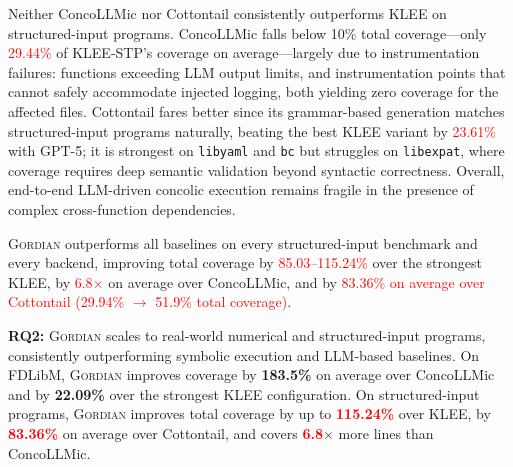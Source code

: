 \documentclass[acmsmall]{acmart}
\newcommand{\rev}[1]{\textcolor{red}{#1}}
\newcommand{\rev}[1]{#1}
\newenvironment{gordianresultbox}{%
  \par\addvspace{0.5\baselineskip plus 2pt}%
  \noindent
  \begingroup
  \setlength{\fboxrule}{0.3mm}%
  \setlength{\fboxsep}{\dimexpr1mm+2pt\relax}%
  \begin{lrbox}{\gordianresultcontent}%
  \begin{minipage}{\dimexpr\linewidth-2\fboxrule-2\fboxsep\relax}%
}{%
  \end{minipage}%
  \end{lrbox}%
  \fcolorbox{black!20}{gray!5}{\usebox{\gordianresultcontent}}%
  \endgroup
  \par\addvspace{0.5\baselineskip plus 2pt}%
}
\newcommand{\projName}{\textsc{Gordian}\xspace}
\theoremstyle{definition}
\begin{document}
Neither ConcoLLMic nor Cottontail consistently outperforms KLEE on structured-input programs. ConcoLLMic falls below 10\% total coverage---only \rev{29.44\%} of KLEE-STP's coverage on average---largely due to instrumentation failures: functions exceeding LLM output limits, and instrumentation points that cannot safely accommodate injected logging, both yielding zero coverage for the affected files. Cottontail fares better since its grammar-based generation matches structured-input programs naturally, beating the best KLEE variant by \rev{23.61\%} with GPT-5; it is strongest on \texttt{libyaml} and \texttt{bc} but struggles on \texttt{libexpat}, where coverage requires deep semantic validation beyond syntactic correctness. Overall, end-to-end LLM-driven concolic execution remains fragile in the presence of complex cross-function dependencies.

\projName{} outperforms all baselines on every structured-input benchmark and every backend, improving total coverage by \rev{85.03--115.24\%} over the strongest KLEE, by \rev{6.8$\times$} on average over ConcoLLMic, and by \rev{83.36\% on average over Cottontail (29.94\% $\to$ 51.9\% total coverage)}.

\begin{gordianresultbox}
\textbf{RQ2:} \projName{} scales  to real-world numerical and structured-input programs, consistently outperforming symbolic execution and LLM-based baselines.
On FDLibM, \projName{} improves coverage by \textbf{183.5\%} on average over ConcoLLMic and by \textbf{22.09\%} over the strongest KLEE configuration.
On structured-input programs, \projName{} improves total coverage by up to \textbf{\rev{115.24\%}} over KLEE, by \textbf{\rev{83.36\%}} on average over Cottontail, and covers \textbf{\rev{6.8}$\times$} more lines than ConcoLLMic.
\end{gordianresultbox}
\end{document}
